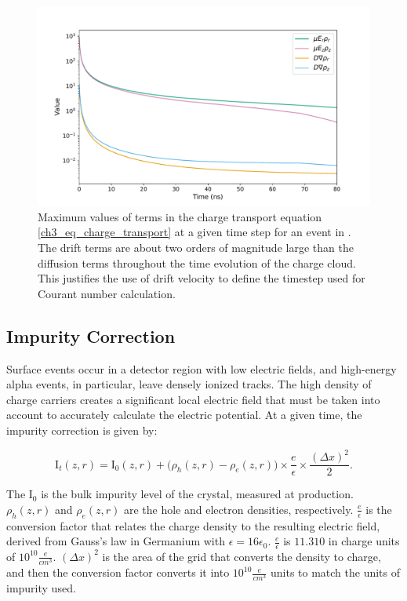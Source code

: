 \begin{figure}%
    \includegraphics[trim={0cm 0 0cm 0},clip,width=0.99\linewidth]{ch3/figs/ehd_pde_comps.pdf}
    \caption{Maximum values of terms in the charge transport equation \ref{ch3_eq_charge_transport} at a given time step for an event in {\ehd}. The drift terms are about two orders of magnitude large than the diffusion terms throughout the time evolution of the charge cloud. This justifies the use of drift velocity to define the timestep used for Courant number calculation.}    
    \label{ch3_fig_ehd_pde_comp}
\end{figure}


\subsection{Impurity Correction}
Surface events occur in a detector region with low electric fields, and high-energy alpha events, in particular, leave densely ionized tracks. The high density of charge carriers creates a significant local electric field that must be taken into account to accurately calculate the electric potential. At a given time, the impurity correction is given by:

\begin{equation}
  {\text{I}_{t}}(z, r) = \text{I}_{0}(z, r) +
  \bigl( \rho_h(z, r) - \rho_e(z, r) \bigr) \times \frac{e}{\epsilon} \times \frac{(\Delta x)^2}{2}.
\end{equation}

\noindent
The $\text{I}_{0}$ is the bulk impurity level of the crystal, measured at production. $\rho_h(z,r)$ and $\rho_e(z,r)$ are the hole and electron densities, respectively. $\frac{e}{\epsilon}$ is the conversion factor that relates the charge density to the resulting electric field, derived from Gauss's law in Germanium with $\epsilon = 16\epsilon_0$. $\frac{e}{\epsilon}$ is $11.310$ in
charge units of $10^{10}\frac{e}{cm^3}$. $(\Delta x)^2$ is the area of the grid that converts the density to charge, and then the conversion factor converts it into $10^{10}\frac{e}{cm^3}$ units to match the units of impurity used.

